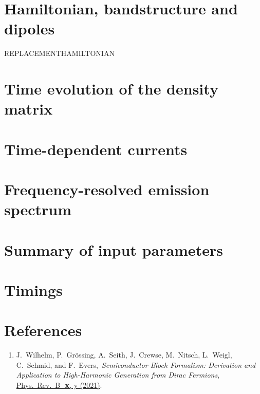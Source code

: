 \documentclass[11pt, a4paper]{scrartcl}
\newcommand{\paper}[4]{\item #1, \,\textit{#2}, \,\href{#3}{#4}.\\[-1.4em]}
\begin{document}
\newpage
\section{Hamiltonian, bandstructure and dipoles}
REPLACEMENTHAMILTONIAN


\section{Time evolution of the density matrix}

\section{Time-dependent currents}

\section{Frequency-resolved emission spectrum}

\section{Summary of input parameters}

\section{Timings}


\section{References}
\begin{enumerate}[leftmargin=*]

\paper{J.~Wilhelm, P.~Grössing, A.~Seith, J.~Crewse, M.~Nitsch, L.~Weigl, C.~Schmid, and F.~Evers}{Semi\-con\-duc\-tor-Bloch Formalism: Derivation and Application to High-Harmonic Generation from Dirac Fermions}{TOBEFILLED}{ 
Phys.~Rev.~B~\,\textbf{x}, y (2021)}
\label{Wilhelm2021}

\end{enumerate}
\end{document}
